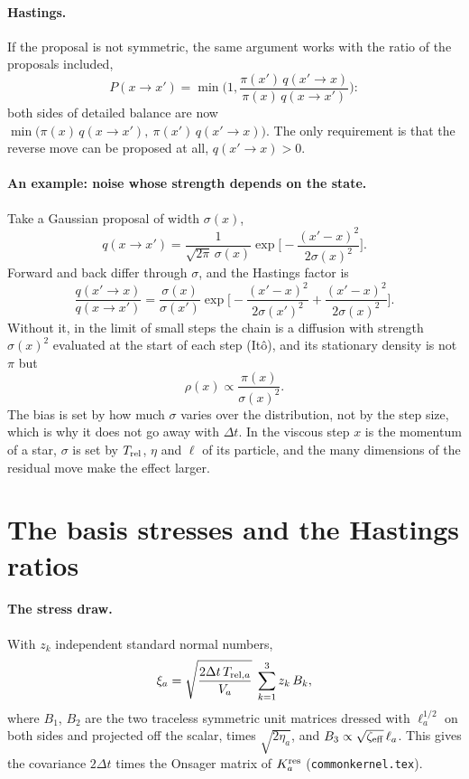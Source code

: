 \documentclass[11pt,aps,preprint,nofootinbib,superscriptaddress,tightenlines]{revtex4-2}
\def\st{\begin{equation}}
\def\stp{\end{equation}}
\let\oldparagraph\paragraph
\renewcommand{\paragraph}{\par\bigskip\oldparagraph}
\begin{document}
\paragraph{Hastings.}  If the proposal is not symmetric, the same argument works with the ratio of the proposals included,
\st
P(x\to x')=\min\Big(1,\frac{\pi(x')\,q(x'\to x)}{\pi(x)\,q(x\to x')}\Big):
\stp
both sides of detailed balance are now $\min\big(\pi(x)\,q(x\to x'),\ \pi(x')\,q(x'\to x)\big)$.  The only requirement is that the reverse move can be
proposed at all, $q(x'\to x)>0$.

\paragraph{An example: noise whose strength depends on the state.}  Take a Gaussian proposal of width $\sigma(x)$,
\st
q(x\to x')=\frac1{\sqrt{2\pi}\,\sigma(x)}\exp\Big[-\frac{(x'-x)^2}{2\sigma(x)^2}\Big].
\stp
Forward and back differ through $\sigma$, and the Hastings factor is
\st
\frac{q(x'\to x)}{q(x\to x')}=\frac{\sigma(x)}{\sigma(x')}\exp\Big[-\frac{(x'-x)^2}{2\sigma(x')^2}+\frac{(x'-x)^2}{2\sigma(x)^2}\Big].
\stp
Without it, in the limit of small steps the chain is a diffusion with strength $\sigma(x)^2$ evaluated at the start of each step (It\^o), and its
stationary density is not $\pi$ but
\st
\rho(x)\propto\frac{\pi(x)}{\sigma(x)^2} .
\stp
The bias is set by how much $\sigma$ varies over the distribution, not by the step size, which is why it does not go away with $\Delta t$.  In the
viscous step $x$ is the momentum of a star, $\sigma$ is set by $T_{\rm rel}$, $\eta$ and $\ell$ of its particle, and the many dimensions of the residual
move make the effect larger.

\section{The basis stresses and the Hastings ratios}
\label{app:hastings}

\paragraph{The stress draw.}  With $z_k$ independent standard normal numbers,
\st
\xi_a=\sqrt{\frac{2\Delta t\,T_{{\rm rel},a}}{V_a}}\;\sum_{k=1}^3z_k\,B_k ,
\stp
where $B_1$, $B_2$ are the two traceless symmetric unit matrices dressed with $\ell_a^{1/2}$ on both sides and projected off the scalar, times
$\sqrt{2\eta_a}$, and $B_3\propto\sqrt{\zeta_{\rm eff}}\,\ell_a$.  This gives the covariance $2\Delta t$ times the Onsager matrix of $K_a^{\rm res}$
(\texttt{commonkernel.tex}).
\end{document}
